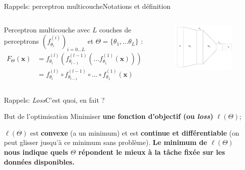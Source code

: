 \documentclass[12pt,dvipsnames,aspectratio=169]{beamer}
\newcommand{\x}[0]{\mathbf{x}}
\newcommand{\f}[1]{f^{(#1)}_{\theta_{#1}}}
\begin{document}
\begin{frame}{Rappels: perceptron multicouche}{Notations et définition}

    \begin{columns}

            Perceptron multicouche avec $L$ couches de perceptrons $(\f{i})_{i=0 \dots L}$ et $\Theta = \{\theta_1, \dots \theta_L\}$ :
    \begin{align*}
        F_\Theta(\x) &= f_{\theta_l}^{(l)}(f_{\theta_{l-1}}^{(l-1)}(\dots f^{(1)}_{\theta_1}(\x))) \\
                 &= \f{l} \circ \f{l-1} \circ \dots \circ \f{1}(\x)
    \end{align*}

    \begin{figure}
        \centering
        \includegraphics[width=\textwidth]{figures/mlp.pdf}
    \end{figure}
    \end{columns}


\end{frame}

\begin{frame}{Rappels: \textit{Loss}}{C'est quoi, en fait ?}

    \begin{block}{But de l'optimisation}
        Minimiser \textbf{une fonction d'objectif (ou \textit{loss})} $\ell(\Theta)$;\par
        $\ell(\Theta)$ est \textbf{convexe} (a un minimum) et  est \textbf{continue et différentiable} (on peut glisser jusqu'à ce minimum sans problème). \textbf{Le minimum de $\ell({\Theta})$ nous indique quels $\Theta$ répondent le mieux à la tâche fixée sur les données disponibles.}
    \end{block}

\end{frame}
\end{document}
